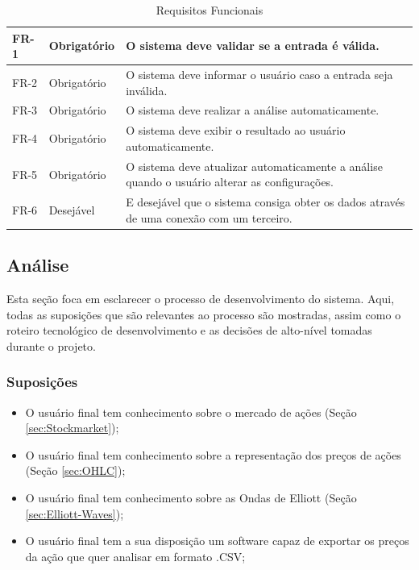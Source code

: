 \documentclass[12pt]{article}
\begin{document}
\begingroup
\renewcommand*{\arraystretch}{1.2}
\begin{table}[H]
	\centering
	\caption{Requisitos Funcionais}
	\label{tab:functional-requirements}
	\begin{tabular}{p{1cm} p{2cm} p{10cm}}
		FR-1 & Obrigatório & O sistema deve validar se a entrada é válida.\\
		\midrule
		FR-2 & Obrigatório & O sistema deve informar o usuário caso a entrada seja inválida.\\
		\midrule
		FR-3 & Obrigatório & O sistema deve realizar a análise automaticamente.\\
		\midrule
		FR-4 & Obrigatório & O sistema deve exibir o resultado ao usuário automaticamente.\\
		\midrule
		FR-5 & Obrigatório & O sistema deve atualizar automaticamente a análise quando o
							 usuário alterar as configurações.\\
		\midrule
		FR-6 & Desejável   & E desejável que o sistema consiga obter os dados através de uma 
							 conexão com um terceiro.\\
	\end{tabular}		
\end{table}
\endgroup

\subsection{Análise}

Esta seção foca em esclarecer o processo de desenvolvimento do sistema. Aqui, todas as
suposições que são relevantes ao processo são mostradas, assim como o roteiro tecnológico de
desenvolvimento e as decisões de alto-nível tomadas durante o projeto.

\subsubsection{Suposições}

\begin{itemize}
	\item O usuário final tem conhecimento sobre o mercado de ações (Seção \ref{sec:Stockmarket});
	\item O usuário final tem conhecimento sobre a representação dos preços de ações (Seção \ref{sec:OHLC});
	\item O usuário final tem conhecimento sobre as Ondas de Elliott (Seção \ref{sec:Elliott-Waves});
	\item O usuário final tem a sua disposição um software capaz de exportar os preços da
		  ação que quer analisar em formato .CSV;
\end{itemize}
\end{document}
